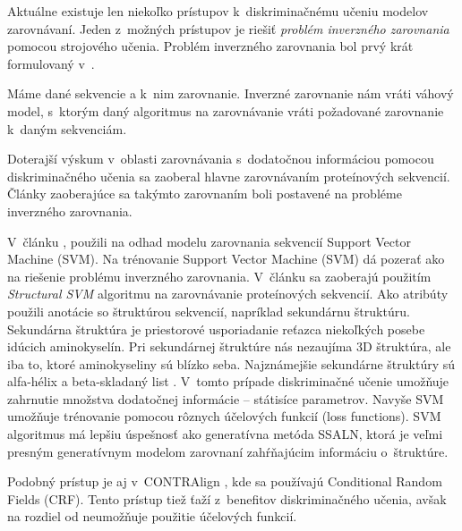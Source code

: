 


Aktuálne existuje len niekoľko prístupov k~diskriminačnému učeniu modelov zarovnávaní.
Jeden z~možných prístupov je riešiť \textit{problém inverzného zarovnania} pomocou strojového učenia. \cite{svmTrainingProteinsAlignment}
Problém inverzného zarovnania bol prvý krát formulovaný v~\cite{inverseAlign1}.
\begin{df}
\label{def:inv-aln}
Máme dané sekvencie a k~nim zarovnanie. Inverzné zarovnanie nám vráti váhový model, s~ktorým daný algoritmus na zarovnávanie vráti požadované zarovnanie k~daným sekvenciám.
\end{df}

Doterajší výskum v~oblasti zarovnávania s~dodatočnou informáciou pomocou diskriminačného učenia sa zaoberal hlavne zarovnávaním proteínových sekvencií. Články zaoberajúce sa takýmto zarovnaním boli postavené na probléme inverzného zarovnania.

V~článku \cite{svmTrainingProteinsAlignment},
použili na odhad modelu zarovnania sekvencií Support Vector Machine (SVM).
Na trénovanie Support Vector Machine (SVM) dá pozerať ako na riešenie problému inverzného zarovnania. V~článku sa zaoberajú použitím \textit{Structural SVM} algoritmu na zarovnávanie proteínových sekvencií. Ako atribúty použili anotácie so štruktúrou sekvencií, napríklad sekundárnu štruktúru.
Sekundárna štruktúra je priestorové usporiadanie reťazca niekoľkých posebe idúcich aminokyselín. Pri sekundárnej štruktúre nás nezaujíma 3D štruktúra, ale iba to, ktoré aminokyseliny sú blízko seba. Najznámejšie sekundárne štruktúry sú alfa-hélix a beta-skladaný list \cite{wiki:bielkovina}.
V~tomto prípade diskriminačné učenie umožňuje zahrnutie množstva dodatočnej informácie -- státisíce parametrov.
Navyše SVM umožňuje trénovanie pomocou rôznych účelových funkcií (loss functions).
SVM algoritmus má lepšiu úspešnosť ako generatívna metóda SSALN, ktorá je veľmi presným generatívnym modelom zarovnaní zahŕňajúcim informáciu o~štruktúre.

Podobný prístup je aj v~CONTRAlign \cite{contralign}, kde sa používajú Conditional Random Fields (CRF). Tento prístup tiež ťaží z~benefitov diskriminačného učenia, avšak na rozdiel od \cite{svmTrainingProteinsAlignment} neumožňuje použitie účelových funkcií.
